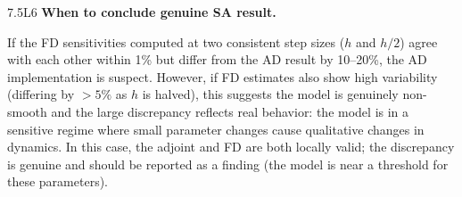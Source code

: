 \begin{solution}{7.5}{L6}
 \textbf{When to conclude genuine SA result.}

If the FD sensitivities computed at two consistent step sizes ($h$ and $h/2$)
agree with each other within 1\% but differ from the AD result by 10--20\%,
the AD implementation is suspect. However, if FD estimates also show
high variability (differing by $>5\%$ as $h$ is halved), this suggests
the model is genuinely non-smooth and the large discrepancy reflects
real behavior: the model is in a sensitive regime where small parameter
changes cause qualitative changes in dynamics. In this case, the adjoint
and FD are both locally valid; the discrepancy is genuine and should
be reported as a finding (the model is near a threshold for these parameters).


\end{solution}

